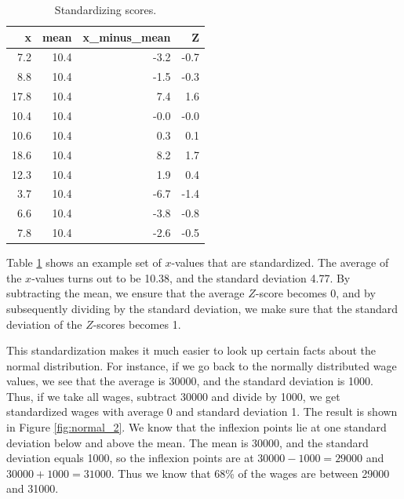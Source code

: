 \documentclass[]{book}\usepackage[]{graphicx}\usepackage[]{color}
\begin{document}
\begin{table}[ht]
\centering
\caption{Standardizing scores.} 
\label{tab:normal_1}
\begin{tabular}{rrrr}
  \hline
x & mean & x\_minus\_mean & Z \\ 
  \hline
7.2 & 10.4 & -3.2 & -0.7 \\ 
  8.8 & 10.4 & -1.5 & -0.3 \\ 
  17.8 & 10.4 & 7.4 & 1.6 \\ 
  10.4 & 10.4 & -0.0 & -0.0 \\ 
  10.6 & 10.4 & 0.3 & 0.1 \\ 
  18.6 & 10.4 & 8.2 & 1.7 \\ 
  12.3 & 10.4 & 1.9 & 0.4 \\ 
  3.7 & 10.4 & -6.7 & -1.4 \\ 
  6.6 & 10.4 & -3.8 & -0.8 \\ 
  7.8 & 10.4 & -2.6 & -0.5 \\ 
   \hline
\end{tabular}
\end{table}


Table \ref{tab:normal_1} shows an example set of $x$-values that are standardized. The average of the $x$-values turns out to be 10.38, and the standard deviation 4.77. By subtracting the mean, we ensure that the average $Z$-score becomes 0, and by subsequently dividing by the standard deviation, we make sure that the standard deviation of the $Z$-scores becomes 1.

This standardization makes it much easier to look up certain facts about the normal distribution. For instance, if we go back to the normally distributed wage values, we see that the average is 30000, and the standard deviation is 1000. Thus, if we take all wages, subtract 30000 and divide by 1000, we get standardized wages with average 0 and standard deviation 1. The result is shown in Figure \ref{fig:normal_2}. We know that the inflexion points lie at one standard deviation below and above the mean. The mean is 30000, and the standard deviation equals 1000, so the inflexion points are at $30000-1000=29000$ and $30000+1000=31000$. Thus we know that 68\% of the wages are between 29000 and 31000.
\end{document}
